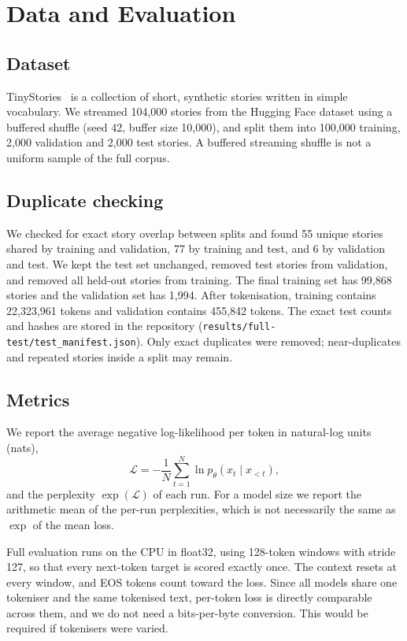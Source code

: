 \documentclass[11pt,a4paper]{article}
\begin{document}
\section{Data and Evaluation}
\label{sec:eval}
\subsection{Dataset}
TinyStories~\cite{TS} is a collection of short, synthetic stories written in simple vocabulary. We streamed 104,000 stories from the Hugging Face dataset using a buffered shuffle (seed 42, buffer size 10,000), and split them into 100,000 training, 2,000 validation and 2,000 test stories. A buffered streaming shuffle is not a uniform sample of the full corpus.

\subsection{Duplicate checking}
We checked for exact story overlap between splits and found 55 unique stories shared by training and validation, 77 by training and test, and 6 by validation and test. We kept the test set unchanged, removed test stories from validation, and removed all held-out stories from training. The final training set has 99,868 stories and the validation set has 1,994. After tokenisation, training contains 22,323,961 tokens and validation contains 455,842 tokens. The exact test counts and hashes are stored in the repository (\texttt{results/full-test/test\_manifest.json}). Only exact duplicates were removed; near-duplicates and repeated stories inside a split may remain.

\subsection{Metrics}
We report the average negative log-likelihood per token in natural-log units (nats),
\begin{equation}
  \mathcal{L}=-\frac{1}{N}\sum_{t=1}^{N}\ln p_\theta(x_t\mid x_{<t}),
\end{equation}
and the perplexity $\exp(\mathcal{L})$ of each run. For a model size we report the arithmetic mean of the per-run perplexities, which is not necessarily the same as $\exp$ of the mean loss.

Full evaluation runs on the CPU in float32, using 128-token windows with stride 127, so that every next-token target is scored exactly once. The context resets at every window, and EOS tokens count toward the loss. Since all models share one tokeniser and the same tokenised text, per-token loss is directly comparable across them, and we do not need a bits-per-byte conversion. This would be required if tokenisers were varied.
\end{document}
